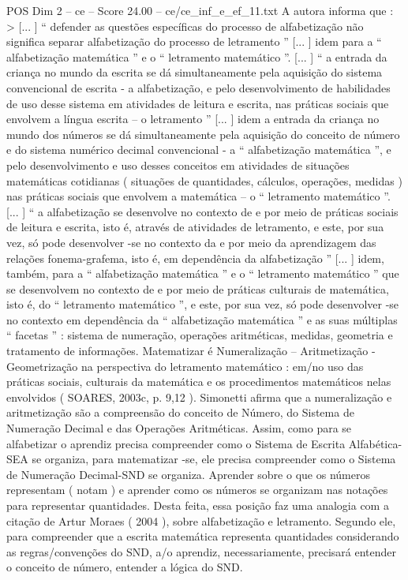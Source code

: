 \begin{textsample}{POS Dim 2 – ce – Score 24.00 – ce/ce\_inf\_e\_ef\_11.txt}
A autora informa que : > [... ] “ defender as questões específicas do processo de alfabetização não significa separar alfabetização do processo de letramento ” [... ] idem para a “ alfabetização matemática ” e o “ letramento matemático ”. [... ] “ a entrada da criança no mundo da escrita se dá simultaneamente pela aquisição do sistema convencional de escrita - a alfabetização, e pelo desenvolvimento de habilidades de uso desse sistema em atividades de leitura e escrita, nas práticas sociais que envolvem a língua escrita – o letramento ” [... ] idem a entrada da criança no mundo dos números se dá simultaneamente pela aquisição do conceito de número e do sistema numérico decimal convencional - a “ alfabetização matemática ”, e pelo desenvolvimento e uso desses conceitos em atividades de situações matemáticas cotidianas ( situações de quantidades, cálculos, operações, medidas ) nas práticas sociais que envolvem a matemática – o “ letramento matemático ”. [... ] “ a alfabetização se desenvolve no contexto de e por meio de práticas sociais de leitura e escrita, isto é, através de atividades de letramento, e este, por sua vez, só pode desenvolver -se no contexto da e por meio da aprendizagem das relações fonema-grafema, isto é, em dependência da alfabetização ” [... ] idem, também, para a “ alfabetização matemática ” e o “ letramento matemático ” que se desenvolvem no contexto de e por meio de práticas culturais de matemática, isto é, do “ letramento matemático ”, e este, por sua vez, só pode desenvolver -se no contexto em dependência da “ alfabetização matemática ” e as suas múltiplas “ facetas ” : sistema de numeração, operações aritméticas, medidas, geometria e tratamento de informações.
Matematizar é Numeralização – Aritmetização - Geometrização na perspectiva do letramento matemático : em/no uso das práticas sociais, culturais da matemática e os procedimentos matemáticos nelas envolvidos ( SOARES, 2003c, p. 9,12 ).
Simonetti afirma que a numeralização e aritmetização são a compreensão do conceito de Número, do Sistema de Numeração Decimal e das Operações Aritméticas.
Assim, como para se alfabetizar o aprendiz precisa compreender como o Sistema de Escrita Alfabética-SEA se organiza, para matematizar -se, ele precisa compreender como o Sistema de Numeração Decimal-SND se organiza.
Aprender sobre o que os números representam ( notam ) e aprender como os números se organizam nas notações para representar quantidades.
Desta feita, essa posição faz uma analogia com a citação de Artur Moraes ( 2004 ), sobre alfabetização e letramento.
Segundo ele, para compreender que a escrita matemática representa quantidades considerando as regras/convenções do SND, a/o aprendiz, necessariamente, precisará entender o conceito de número, entender a lógica do SND.

\end{textsample}
